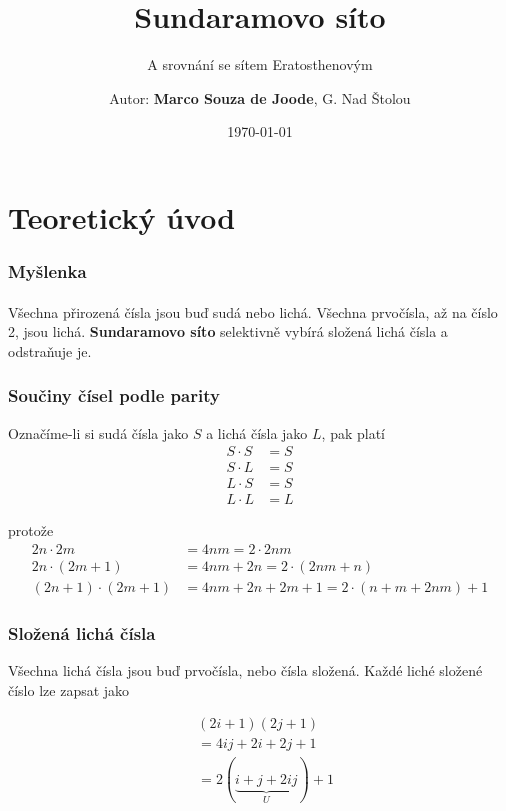 \documentclass{beamer}
\title[krátký titulek prezentace]{Sundaramovo síto}
\subtitle[krátký název prezentace]{A srovnání se sítem Eratosthenovým}
\author{Autor: \textbf{Marco Souza de Joode}, G. Nad Štolou}
\date{\today}
\begin{document}

\begin{frame}
  \titlepage
\end{frame}




\section{Teoretický úvod}
\begin{frame}

  \frametitle{Myšlenka}
  \framesubtitle{}


Všechna přirozená čísla jsou buď sudá nebo lichá.
Všechna prvočísla, až na číslo 2, jsou lichá. \textbf{Sundaramovo síto} selektivně vybírá složená lichá čísla a odstraňuje je.	 

\end{frame}



\begin{frame}
  \frametitle{Součiny čísel podle parity}
 
Označíme-li si sudá čísla jako $S$ a lichá čísla jako $L$, pak platí
\begin{align*}
S\cdot S &= S\\
S \cdot L &= S\\
L \cdot S &= S\\
L \cdot L &= L
\end{align*}

protože
\begin{align*}
2n \cdot 2m &= 4nm = 2 \cdot 2nm\\
2n \cdot (2m+1) &= 4nm + 2n = 2 \cdot (2nm + n) \\
(2n +1) \cdot (2m+1) &= 4nm + 2n + 2m + 1 = 2 \cdot (n + m + 2nm) + 1
\end{align*}


\end{frame}




\begin{frame}
  \frametitle{Složená lichá čísla}

Všechna lichá čísla jsou buď prvočísla, nebo čísla složená. Každé liché složené číslo lze zapsat jako

\begin{align*}
&(2i + 1)(2j +1)\\
&= 4ij + 2i + 2j +1\\
&= 2(\underbrace{i + j + 2ij}_{U}) + 1
\end{align*}


\end{frame}
\end{document}
